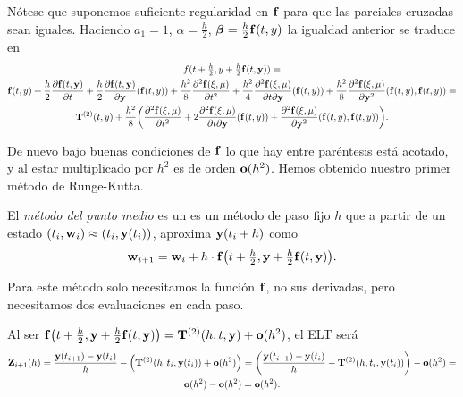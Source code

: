 Nótese que suponemos suficiente regularidad en $\vb{f}$
para que las parciales cruzadas sean iguales.
Haciendo $a_1 = 1$, $\alpha = \frac{h}{2}$, $\vb*{\beta} = \frac{h}{2} \vb{f}(t,y)$
la igualdad anterior se traduce en
\begin{multline*}
    f(t + \tfrac{h}{2}, y + \tfrac{h}{2}\vb{f}(t, \vb{y})) = \\
    \vb{f}(t,y) +
        \frac{h}{2}\pdv{\vb{f}(t, \vb{y})}{t} +
        \frac{h}{2}\pdv{\vb{f}(t, \vb{y})}{\vb{y}} \qty(\vb{f}(t, y)) +
        \frac{h^2}{8}\pdv[2]{\vb{f}(\xi, \mu)}{t} +
        \frac{h^2}{4}\pdv{\vb{f}(\xi, \mu)}{t}{\vb{y}} \qty(\vb{f}(t, y)) +
        \frac{h^2}{8}\pdv[2]{\vb{f}(\xi, \mu)}{\vb{y}} \qty(\vb{f}(t, y), \vb{f}(t, y)) = \\
    \vb{T}^{(2)}(t, y) + \frac{h^2}{8}\qty(
        \pdv[2]{\vb{f}(\xi, \mu)}{t} +
        2\pdv{\vb{f}(\xi, \mu)}{t}{\vb{y}} \qty(\vb{f}(t, y)) +
        \pdv[2]{\vb{f}(\xi, \mu)}{\vb{y}} \qty(\vb{f}(t, y), \vb{f}(t, y))
    ).
\end{multline*}

De nuevo bajo buenas condiciones de $\vb{f}$
lo que hay entre paréntesis está acotado,
y al estar multiplicado por $h^2$ es de orden $\vb{o}(h^2)$.
Hemos obtenido nuestro primer método de Runge-Kutta.

\begin{method}\label{met:euler}
    El \emph{método del punto medio} es un es un método de paso fijo $h$ que
    a partir de un estado $(t_i, \vb{w}_i) \approx (t_i, \vb{y}(t_i))$,
    aproxima $\vb{y}(t_i + h)$ como
    \begin{equation*}
        \vb{w}_{i+1} = \vb{w}_i + h\cdot \vb{f}\qty(
            t + \tfrac{h}{2}, \vb{y} + \tfrac{h}{2}\vb{f}(t, \vb{y})
        ).
    \end{equation*}
\end{method}

\begin{remark}
    Para este método solo necesitamos la función $\vb{f}$, no sus derivadas,
    pero necesitamos dos evaluaciones en cada paso.
\end{remark}

\begin{remark}
    Al ser $\vb{f}\qty(t + \tfrac{h}{2}, \vb{y} + \tfrac{h}{2}\vb{f}(t, \vb{y})) =
    \vb{T}^{(2)}(h, t, \vb{y}) + \vb{o}(h^2)$,
    el ELT será
    \begin{multline*}
        \vb{Z}_{i+1}(h) =
        \frac{\vb{y}(t_{i+1}) - \vb{y}(t_i)}{h} - \qty(
            \vb{T}^{(2)}(h, t_i, \vb{y}(t_i)) + \vb{o}(h^2)
        ) =
        \qty(
            \frac{\vb{y}(t_{i+1}) - \vb{y}(t_i)}{h} - \vb{T}^{(2)}(h, t_i, \vb{y}(t_i))
        ) - \vb{o}(h^2) = \\
        \vb{o}(h^2) - \vb{o}(h^2) = \vb{o}(h^2).
    \end{multline*}
\end{remark}

